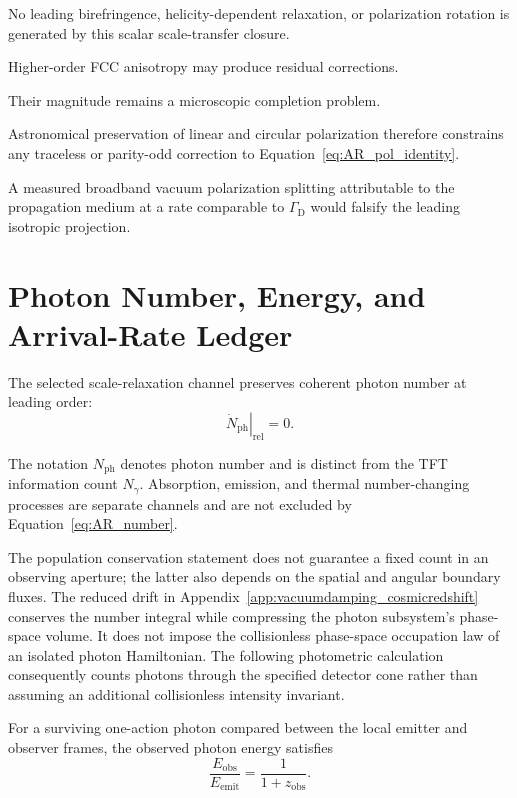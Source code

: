 No leading birefringence, helicity-dependent relaxation, or polarization
rotation is generated by this scalar scale-transfer closure.

Higher-order FCC anisotropy may produce residual corrections.

Their magnitude remains a microscopic completion problem.

Astronomical preservation of linear and circular polarization therefore
constrains any traceless or parity-odd correction to
Equation~\eqref{eq:AR_pol_identity}.

A measured broadband vacuum polarization splitting attributable to the
propagation medium at a rate comparable to \(\Gamma_{\mathrm D}\) would
falsify the leading isotropic projection.


\section{Photon Number, Energy, and Arrival-Rate Ledger}

The selected scale-relaxation channel preserves coherent photon number at
leading order:
\begin{equation}
    \boxed{
    \left.
    \dot N_{\mathrm{ph}}
    \right|_{\mathrm{rel}}
    =
    0.
    }
    \label{eq:AR_number}
\end{equation}

The notation \(N_{\mathrm{ph}}\) denotes photon number and is distinct from the
TFT information count \(N_\gamma\). Absorption, emission, and thermal
number-changing processes are separate channels and are not excluded by
Equation~\eqref{eq:AR_number}.

The population conservation statement does not guarantee a fixed count in
an observing aperture; the latter also depends on the spatial and angular
boundary fluxes. The reduced drift in
Appendix~\ref{app:vacuumdamping_cosmicredshift} conserves the number integral
while compressing the photon subsystem's phase-space volume. It does not
impose the collisionless phase-space occupation law of an isolated photon
Hamiltonian. The following photometric calculation consequently counts
photons through the specified detector cone rather than assuming an
additional collisionless intensity invariant.

For a surviving one-action photon compared between the local emitter and
observer frames, the observed photon energy satisfies
\begin{equation}
    \boxed{
    \frac{
        E_{\mathrm{obs}}
    }{
        E_{\mathrm{emit}}
    }
    =
    \frac{1}{
        1+z_{\mathrm{obs}}
    }.
    }
    \label{eq:AR_energy_factor}
\end{equation}


